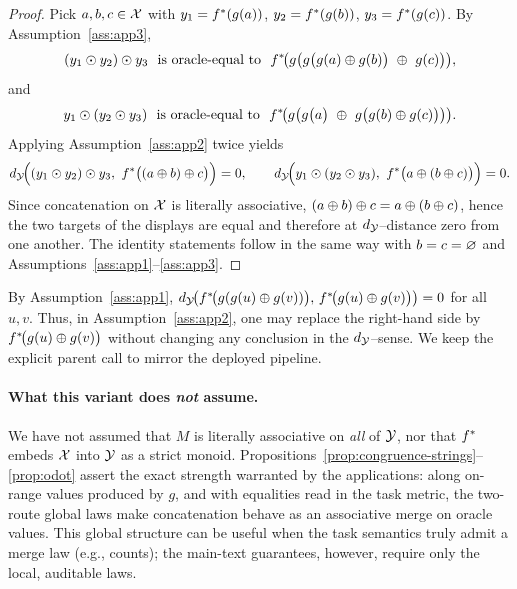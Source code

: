 \begin{proof}
Pick $a,b,c\in\mathcal{X}$ with $y_1=f^{\ast}(g(a))$, $y_2=f^{\ast}(g(b))$, $y_3=f^{\ast}(g(c))$. By Assumption~\ref{ass:app3},
\[
(y_1\odot y_2)\odot y_3\ \text{ is oracle-equal to }\ \fstar\!\big(g\big(g\big(g(a)\concat g(b)\big)\ \concat\ g(c)\big)\big),
\]
and
\[
y_1\odot(y_2\odot y_3)\ \text{ is oracle-equal to }\ f^{\ast}\!\big(g\big(g\big(a\big)\ \oplus\ g\big(g(b)\oplus g(c)\big)\big)\big).
\]
Applying Assumption~\ref{ass:app2} twice yields
\[
d_{\mathcal{Y}}\!\Big((y_1\odot y_2)\odot y_3,\ f^{\ast}\big((a\oplus b)\oplus c\big)\Big)=0,\qquad
d_{\mathcal{Y}}\!\Big(y_1\odot (y_2\odot y_3),\ f^{\ast}\big(a\oplus(b\oplus c)\big)\Big)=0.
\]
Since concatenation on $\mathcal{X}$ is literally associative, $(a\oplus b)\oplus c=a\oplus(b\oplus c)$, hence the two targets of the displays are equal and therefore at $d_{\mathcal{Y}}$–distance zero from one another. The identity statements follow in the same way with $b=c=\varnothing$ and Assumptions~\ref{ass:app1}–\ref{ass:app3}.
\end{proof}

\begin{remark}
By Assumption~\ref{ass:app1}, $d_{\mathcal{Y}}\!\big(f^{\ast}\!\big(g(g(u)\oplus g(v))\big),\,f^{\ast}\!\big(g(u)\oplus g(v)\big)\big)=0$ for all $u,v$. Thus, in Assumption~\ref{ass:app2}, one may replace the right-hand side by $f^{\ast}\!\big(g(u)\oplus g(v)\big)$ without changing any conclusion in the $d_{\mathcal{Y}}$–sense. We keep the explicit parent call to mirror the deployed pipeline.
\end{remark}

\paragraph{What this variant does \emph{not} assume.} We have not assumed that $M$ is literally associative on \emph{all} of $\mathcal{Y}$, nor that $f^{\ast}$ embeds $\mathcal{X}$ into $\mathcal{Y}$ as a strict monoid. Propositions~\ref{prop:congruence-strings}–\ref{prop:odot} assert the exact strength warranted by the applications: along on-range values produced by $g$, and with equalities read in the task metric, the two-route global laws make concatenation behave as an associative merge on oracle values. This global structure can be useful when the task semantics truly admit a merge law (e.g., counts); the main-text guarantees, however, require only the local, auditable laws.
